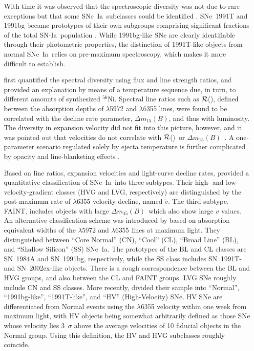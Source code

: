 \documentclass[apj]{emulateapj-rtx4}
\newcommand{\dm}{$\Delta m_{15}(B)$}
\newcommand{\rsi}{$\cal{R}$(\ion{Si}{2})}
\newcommand{\sndia}{SN-Ia}
\newcommand{\sneia}{SNe~Ia}
\begin{document}
With time it was observed that the spectroscopic diversity was not
due to rare exceptions but that some \sneia\ subclasses could be
identified \citep{li01}. SNe~1991T and 1991bg became prototypes of
their own subgroups comprising significant fractions of the
total \sndia\ population \citep[e.g.][find fractions of $>$9\% and
  18\%, respectively, for these subclasses]{li10}. While 1991bg-like
SNe are clearly identifiable through their photometric
properties, the distinction of 1991T-like objects from normal
\sneia\ relies on pre-maximum spectroscopy, which makes it more
difficult to establish. 

\citet{nugent95} first quantified the spectral diversity using flux and
line strength ratios, and provided an explanation by means of a temperature
sequence due, in turn, to different amounts of synthesized
$^{56}$Ni. Spectral line ratios such as \rsi, defined
between the absorption depths of  $\lambda$5972 and
$\lambda$6355 lines, were found to be correlated with the decline rate
parameter, \dm \citep{phillips93}, and thus with luminosity. The
diversity in expansion velocity did not fit into this picture, however,
and it was pointed out that  velocities do not correlate with
\rsi\ or \dm\ \citep{hatano00}. A one-parameter scenario regulated
solely by ejecta temperature is further complicated by opacity and
line-blanketing effects \citep{hoeflich96,pinto00,kasen07a}.

Based on line ratios, expansion velocities
and light-curve decline rates, \citet{benetti05} provided a
quantitative classification of \sneia\ into three subtypes. Their high- and
low-velocity-gradient classes (HVG and LVG, respectively) are
distinguished by the post-maximum rate of  $\lambda$6355 
velocity decline, named $\dot{v}$. The third subtype, FAINT, includes
objects with large \dm\ which also show large $\dot{v}$
values. An alternative classification scheme was introduced by
\citet{branch06} based on absorption equivalent widths of the
 $\lambda$5972 and $\lambda$6355 lines at maximum
light. They distinguished between ``Core Normal'' (CN), ``Cool'' (CL),
``Broad Line'' (BL), and ``Shallow Silicon'' (SS) \sneia. The
prototypes of the BL and CL classes are SN~1984A and SN~1991bg,
respectively, while the SS class includes SN~1991T- and SN~2002cx-like
objects. There is a rough correspondence between the BL and 
HVG groups, and also between the CL and FAINT groups. LVG SNe roughly
include CN and SS classes. More recently, \citet{wang09} divided their
sample into ``Normal'', ``1991bg-like'', ``1991T-like'', and ``HV''
(High-Velocity) SNe. HV SNe are differentiated from Normal events
using the  $\lambda$6355 velocity within one week from
maximum light, with HV objects 
being somewhat arbitrarily defined as those SNe whose velocity lies
3~$\sigma$ above the average velocities of 10 fiducial objects in the
Normal group. Using this definition, the HV and HVG subclasses roughly coincide.
\end{document}
